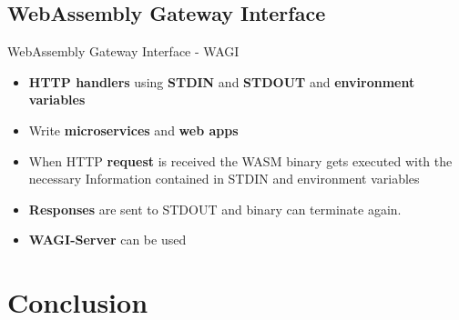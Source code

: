 \documentclass{beamer}
\begin{document}

\subsection{WebAssembly Gateway Interface}
\begin{frame}{WebAssembly Gateway Interface - WAGI}
    \begin{itemize}
        \item \textbf{HTTP handlers} using \textbf{STDIN} and \textbf{STDOUT} and \textbf{environment variables}
        \item Write \textbf{microservices} and \textbf{web apps}
        \item When HTTP \textbf{request} is received the WASM binary gets executed with the necessary Information contained in STDIN and environment variables
        \item \textbf{Responses} are sent to STDOUT and binary can terminate again.
        \item \textbf{WAGI-Server} can be used
    \end{itemize}
\end{frame}

\section{Conclusion}
\end{document}
